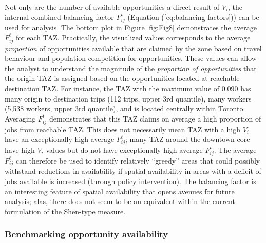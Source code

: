 \documentclass[10pt,letterpaper]{article}
\begin{document}
Not only are the number of available opportunities a direct result of
\(V_i\), the internal combined balancing factor \(F_{ij}^t\) (Equation
(\ref{eq:balancing-factors})) can be used for analysis. The bottom plot
in Figure \ref{fig:Fig8} demonstrates the average \(F_{ij}^t\) for each
TAZ. Practically, the visualized values corresponds to the average
\emph{proportion} of opportunities available that are claimed by the
zone based on travel behaviour and population competition for
opportunities. These values can allow the analyst to understand the
magnitude of the \emph{proportion of opportunities} that the origin TAZ
is assigned based on the opportunities located at reachable destination
TAZ. For instance, the TAZ with the maximum value of 0.090 has many
origin to destination trips (112 trips, upper 3rd quantile), many
workers (5,538 workers, upper 3rd quantile), and is located centrally
within Toronto. Averaging \(F_{ij}^t\) demonstrates that this TAZ claims
on average a high proportion of jobs from reachable TAZ. This does not
necessarily mean TAZ with a high \(V_i\) have an exceptionally high
average \(F_{ij}^t\); many TAZ around the downtown core have high
\(V_i\) values but do not have exceptionally high average \(F_{ij}^t\).
The average \(F_{ij}^t\) can therefore be used to identify relatively
``greedy'' areas that could possibly withstand reductions in
availability if spatial availability in areas with a deficit of jobs
available is increased (through policy intervention). The balancing
factor is an interesting feature of spatial availability that opens
avenues for future analysis; alas, there does not seem to be an
equivalent within the current formulation of the Shen-type measure.

\hypertarget{benchmarking-opportunity-availability}{%
\subsubsection{Benchmarking opportunity
availability}\label{benchmarking-opportunity-availability}}
\end{document}
